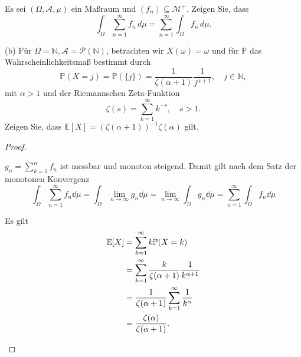 \begin{Problem}
	\begin{parts}
		\item Es sei $(\Omega, \mathcal{A}, \mu)$ ein Maßraum und $(f_n) \subseteq \mathcal{M}^+$. Zeigen Sie, dass
		\[
		\int_\Omega \sum_{n=1}^\infty f_n \, d\mu = \sum_{n=1}^\infty \int_\Omega f_n \, d\mu.
		\]
		
		\item[(b)] Für $\Omega = \mathbb{N}, \mathcal{A} = \mathcal{P}(\mathbb{N})$, betrachten wir $X(\omega) = \omega$ und für $\mathbb{P}$ das Wahrscheinlichkeitsmaß bestimmt durch
		\[
		\mathbb{P}(X = j) = \mathbb{P}(\{j\}) = \frac{1}{\zeta(\alpha + 1)} \frac{1}{j^{\alpha+1}}, \quad j \in \mathbb{N},
		\]
		mit $\alpha > 1$ und der Riemannschen Zeta-Funktion
		\[
		\zeta(s) = \sum_{k=1}^\infty k^{-s}, \quad s > 1.
		\]
		Zeigen Sie, dass $\mathbb{E}[X] = (\zeta(\alpha + 1))^{-1} \zeta(\alpha)$ gilt.
	\end{parts}
\end{Problem}
\begin{proof}
	\begin{parts}
		\item $g_n = \sum_{k=1}^n f_n$ ist messbar und monoton steigend. Damit gilt nach dem Satz der monotonen Konvergenz
		\[\int_\Omega \sum_{n=1}^\infty f_n\dd{\mu} = \int_\Omega \lim_{n\to\infty} g_n \dd{\mu} = \lim_{n\to\infty} \int_\Omega g_n \dd{\mu} = \sum_{n=1}^\infty \int_\Omega f_n \dd{\mu}\]
		\item Es gilt
		\begin{align*}
			\mathbb{E}[X]&= \sum_{k=1}^\infty k \mathbb{P}(X = k)\\
			&=\sum_{k=1}^\infty \frac{k}{\zeta(\alpha + 1)}\frac1{k^{\alpha + 1}}\\
			&=\frac 1{\zeta(\alpha+1)}\sum_{k=1}^\infty \frac{1}{k^\alpha}\\
			&= \frac{\zeta(\alpha)}{\zeta(\alpha+1)}.\qedhere
		\end{align*}
	\end{parts}
\end{proof}

